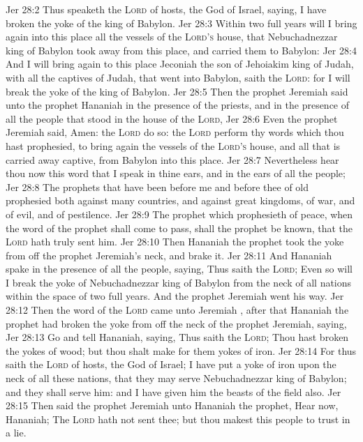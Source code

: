 \vs Jer 28:2 Thus speaketh the \textsc{Lord} of hosts, the God of Israel, saying, I have broken the yoke of the king of Babylon.
\vs Jer 28:3 Within two full years will I bring again into this place all the vessels of the \textsc{Lord's} house, that Nebuchadnezzar king of Babylon took away from this place, and carried them to Babylon:
\vs Jer 28:4 And I will bring again to this place Jeconiah the son of Jehoiakim king of Judah, with all the captives of Judah, that went into Babylon, saith the \textsc{Lord}: for I will break the yoke of the king of Babylon.
\vs Jer 28:5 Then the prophet Jeremiah said unto the prophet Hananiah in the presence of the priests, and in the presence of all the people that stood in the house of the \textsc{Lord},
\vs Jer 28:6 Even the prophet Jeremiah said, Amen: the \textsc{Lord} do so: the \textsc{Lord} perform thy words which thou hast prophesied, to bring again the vessels of the \textsc{Lord's} house, and all that is carried away captive, from Babylon into this place.
\vs Jer 28:7 Nevertheless hear thou now this word that I speak in thine ears, and in the ears of all the people;
\vs Jer 28:8 The prophets that have been before me and before thee of old prophesied both against many countries, and against great kingdoms, of war, and of evil, and of pestilence.
\vs Jer 28:9 The prophet which prophesieth of peace, when the word of the prophet shall come to pass,  shall the prophet be known, that the \textsc{Lord} hath truly sent him.
\vs Jer 28:10 Then Hananiah the prophet took the yoke from off the prophet Jeremiah's neck, and brake it.
\vs Jer 28:11 And Hananiah spake in the presence of all the people, saying, Thus saith the \textsc{Lord}; Even so will I break the yoke of Nebuchadnezzar king of Babylon from the neck of all nations within the space of two full years. And the prophet Jeremiah went his way.
\vs Jer 28:12 Then the word of the \textsc{Lord} came unto Jeremiah , after that Hananiah the prophet had broken the yoke from off the neck of the prophet Jeremiah, saying,
\vs Jer 28:13 Go and tell Hananiah, saying, Thus saith the \textsc{Lord}; Thou hast broken the yokes of wood; but thou shalt make for them yokes of iron.
\vs Jer 28:14 For thus saith the \textsc{Lord} of hosts, the God of Israel; I have put a yoke of iron upon the neck of all these nations, that they may serve Nebuchadnezzar king of Babylon; and they shall serve him: and I have given him the beasts of the field also.
\vs Jer 28:15 Then said the prophet Jeremiah unto Hananiah the prophet, Hear now, Hananiah; The \textsc{Lord} hath not sent thee; but thou makest this people to trust in a lie.
